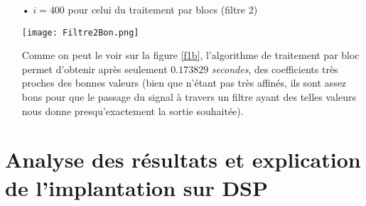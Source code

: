 \begin{itemize}
\begin{itemize}
\item[•] $ i=400 $ pour celui du traitement par blocs (filtre 2)
\begin{center}
\texttt{[image: Filtre2Bon.png]}
\label{f2b}
\end{center}
Comme on peut le voir sur la figure \ref{f1b}, l'algorithme de traitement par bloc permet d'obtenir après seulement $ 0.173829 $ \emph{secondes}, des coefficients très proches des bonnes valeurs (bien que n'étant pas très affinés, ils sont assez bons pour que le passage du signal à travers un filtre ayant des telles valeurs nous donne presqu'exactement la sortie souhaitée).
\end{itemize}
\end{itemize}
\section{Analyse des résultats et explication de l'implantation sur DSP}

